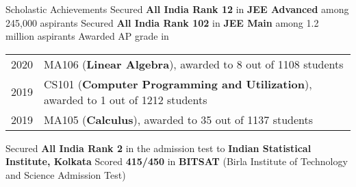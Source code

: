 \begin{rubric}{Scholastic Achievements}
    \entry*[2019] Secured \textbf{All India Rank 12} in \textbf{JEE Advanced} among 245,000 aspirants
    \entry*[2019\phantom{}] Secured \textbf{All India Rank 102} in \textbf{JEE Main} among 1.2 million aspirants
    \entry* Awarded AP grade in
        
        \begin{tabular}{@{}ll}
           2020 & MA106 (\textbf{Linear Algebra}), awarded to 8 out of 1108 students \\
           2019 & CS101 (\textbf{Computer Programming and Utilization}), awarded to 1 out of 1212 students \\
           2019 & MA105 (\textbf{Calculus}), awarded to 35 out of 1137 students \\
        \end{tabular}
    \entry*[2019\phantom{}] Secured \textbf{All India Rank 2} in the admission test to \textbf{Indian Statistical Institute, Kolkata}
    \entry*[2019] Scored \textbf{415/450} in \textbf{BITSAT} (Birla Institute of Technology and Science Admission Test)
\end{rubric}